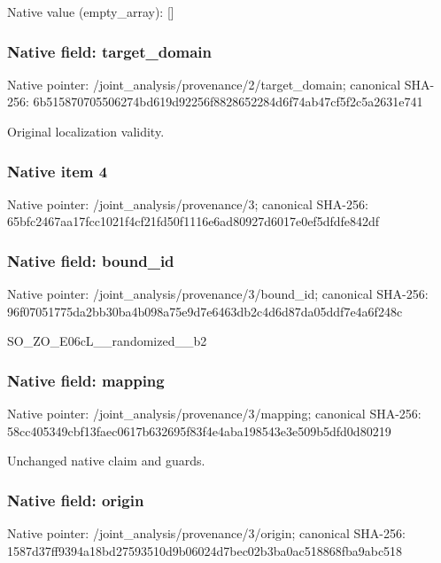 \documentclass[10pt,a4paper]{article}
\begin{document}
Native value (empty\_array): []



\subsubsection{Native field: target\_domain}


Native pointer: /joint\_analysis/provenan\allowbreak{}ce/2/target\_domain; canonical SHA-256: 6b515870705506274bd619d9\allowbreak{}2256f8828652284d6f74ab47\allowbreak{}cf5f2c5a2631e741


Original localization validity.


\subsubsection{Native item 4}


Native pointer: /joint\_analysis/provenance/3; canonical SHA-256: 65bfc2467aa17fcc1021f4cf\allowbreak{}21fd50f1116e6ad80927d601\allowbreak{}7e0ef5dfdfe842df



\subsubsection{Native field: bound\_id}


Native pointer: /joint\_analysis/provenance/3/bound\_id; canonical SHA-256: 96f07051775da2bb30ba4b09\allowbreak{}8a75e9d7e6463db2c4d6d87d\allowbreak{}a05ddf7e4a6f248c


SO\_ZO\_E06cL\_\_randomized\_\_b2


\subsubsection{Native field: mapping}


Native pointer: /joint\_analysis/provenance/3/mapping; canonical SHA-256: 58cc405349cbf13faec0617b\allowbreak{}632695f83f4e4aba198543e3\allowbreak{}e509b5dfd0d80219


Unchanged native claim and guards.


\subsubsection{Native field: origin}


Native pointer: /joint\_analysis/provenance/3/origin; canonical SHA-256: 1587d37ff9394a18bd275935\allowbreak{}10d9b06024d7bec02b3ba0ac\allowbreak{}518868fba9abc518
\end{document}
